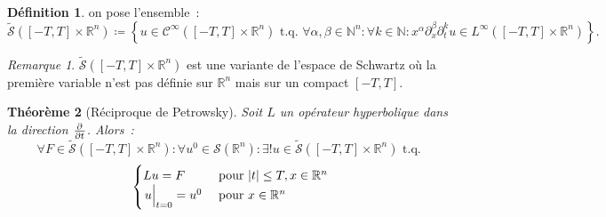 \documentclass{report}
\newcommand{\R}{{\mathbb R}}
\newcommand{\N}{{\mathbb N}}
\newcommand{\tq}{\text{ t.q. }}
\newcommand{\st}{\tq}
\newcommand{\restr}[2]{\left.#1\vphantom{\big|}\right|_{#2}}
\newtheorem{thm}{Théorème}[chapter]
\theoremstyle{definition}
\newtheorem{déf}[thm]{Définition}
\theoremstyle{remark}
\newtheorem*{rmq}{Remarque}
\begin{document}
\begin{déf} on pose l'ensemble~:
\[\widetilde {\mathcal S}([-T, T] \times \R^n) \coloneqq \left\{u \in \mathcal C^\infty([-T, T] \times \R^n) \st \forall \alpha, \beta \in \N^n : \forall k \in \N :
	x^\alpha\partial_x^\beta\partial_t^ku \in L^\infty([-T, T] \times \R^n)\right\}.\]
\end{déf}

\begin{rmq} $\widetilde{\mathcal S}([-T, T] \times \R^n)$ est une variante de l'espace de Schwartz où la première variable n'est pas définie sur $\R^n$ mais sur un compact $[-T, T]$.
\end{rmq}

\begin{thm}[Réciproque de Petrowsky] Soit $L$ un opérateur hyperbolique dans la direction $\pd {}t$. Alors~:
\[\forall F \in \widetilde {\mathcal S}([-T, T] \times \R^n) : \forall u^0 \in \mathcal S(\R^n) : \exists! u \in \widetilde {\mathcal S}([-T, T] \times \R^n) \st\]
\[\begin{cases}
	Lu = F &\text{ pour } \abs t \leq T, x \in \R^n \\
	\restr u{t=0} = u^0 &\text{ pour } x \in \R^n
\end{cases}\]
\end{thm}
\end{document}
